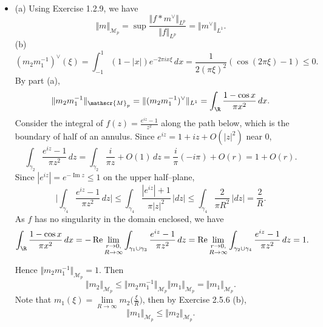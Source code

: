 \begin{itemize}
\item[2.5.8]
(a)
Using Exercise 1.2.9, we have
$$\Vert m\Vert_{\mathscr{M}_p}
=\sup\frac{\Vert f*m^\vee\Vert_{L^p}}{\Vert f\Vert _{L^p}}
=\Vert m^\vee\Vert_{L^1}.$$
(b) $$(m_2m_1^{-1})^\vee(\xi)=\int_{-1}^1(1-|x|)e^{-2\pi ix\xi}\,dx
=\frac1{2(\pi \xi)^2}(\cos(2\pi\xi)-1)\leq0 .$$
By part (a),
$$\Vert m_2m_1^{-1}\Vert_{\mathscr{M}_p}=\Vert (m_2m_1^{-1})^\vee\Vert_{L^1}
=\int_\R\frac{1-\cos x}{\pi x^2}\,dx.$$
Consider the integral of $f(z)=\frac{e^{iz}-1}{z^2}$ 
along the path below, which is the boundary of half of an annulus. 
Since $e^{iz}=1+iz+O(|z|^2)$ near $0$, 
$$\int_{\gamma_2}\frac{e^{iz}-1}{\pi z^2}\,dz
=\int_{\gamma_2}\frac{i}{\pi z}+O(1)\,dz
=\frac{i}{\pi}(-i\pi)+O(r)=1+O(r).$$
Since $|e^{iz}|=e^{-\operatorname{Im}z}\le1$ on the upper half--plane,
$$\bigg|\int_{\gamma_4}\frac{e^{iz}-1}{\pi z^2}\,dz\bigg|
\le\int_{\gamma_4}\frac{|e^{iz}|+1}{\pi |z|^2}\,|dz|
\le\int_{\gamma_4}\frac{2}{\pi R^2}\,|dz|=\frac{2}{R}.$$
As $f$ has no singularity in the domain enclosed, we have
$$\int_\R\frac{1-\cos x}{\pi x^2}\,dx
=-\operatorname{Re}\lim_{\begin{subarray}{c}r\to0,\\R\to\infty\end{subarray}}
\int_{\gamma_1\cup\gamma_3}\frac{e^{iz}-1}{\pi z^2}\,dz
=\operatorname{Re}\lim_{\begin{subarray}{c}r\to0,\\R\to\infty\end{subarray}}
\int_{\gamma_2\cup\gamma_4}\frac{e^{iz}-1}{\pi z^2}\,dz=1.$$
Hence $\Vert m_2m_1^{-1}\Vert _{\mathscr{M}_p}=1$. Then
$$\Vert m_2\Vert _{\mathscr{M}_p}
\leq \Vert m_2m_1^{-1}\Vert _{\mathscr{M}_p}\Vert m_1\Vert _{\mathscr{M}_p}
=\Vert m_1\Vert _{\mathscr{M}_p}.$$
Note that $m_1(\xi)=\lim\limits_{R\rightarrow\infty} m_2\big(\frac{\xi}{R}\big)$, 
then by Exercise 2.5.6 (b), 
$$\Vert m_1\Vert _{\mathscr{M}_p}\leq \Vert m_2\Vert_{\mathscr{M}_p}.$$


\end{itemize}
